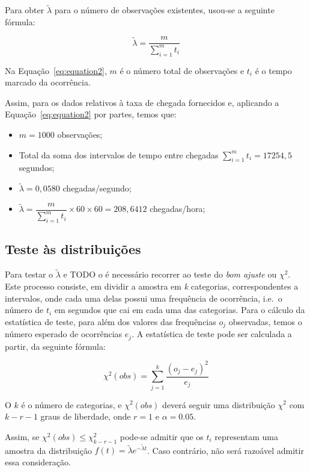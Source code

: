 Para obter $\tilde{\lambda}$ para o número de observações existentes, usou-se
a seguinte fórmula:

\begin{equation}
	\tilde{\lambda}	= \dfrac{m}{\sum^{m}_{i=1} t_i}
	\label{eq:equation2}
\end{equation}

Na Equação~\ref{eq:equation2}, $m$ é o número total de observações e $t_i$
é o tempo marcado da ocorrência.

Assim, para os dados relativos à taxa de chegada fornecidos
e, aplicando a Equação~\ref{eq:equation2} por partes, temos que:

\begin{itemize}
	\item $m=1000$ observações; 
	\item Total da soma dos intervalos de tempo entre chegadas $\sum^{m}_{i=1}
		t_i = 17254,5$ segundos;
	\item $\tilde{\lambda} = 0,0580$ chegadas/segundo;
	\item $\tilde{\lambda} = \dfrac{m}{\sum^{m}_{i=1} t_i} \times 60 \times 60
		= 208,6412$ chegadas/hora;
\end{itemize}

\subsection{Teste às distribuições}
\label{subsection:td}
Para testar o $\tilde{\lambda}$ e TODO o é necessário recorrer ao teste do \emph{bom
ajuste} ou $\chi^2$. Este processo consiste, em dividir a amostra em \emph{k}
categorias, correspondentes a intervalos, onde cada uma delas possui uma
frequência de ocorrência, i.e.\, o número de $t_i$ em segundos que cai em cada
uma das categorias. Para o cálculo da estatística de teste, para além dos
valores das frequências $o_j$ observadas, temos o número esperado de ocorrências
$e_j$. A estatística de teste pode ser calculada a partir, da seguinte fórmula:

\begin{equation}
	\chi^{2}(obs) = \sum^{k}_{j=1}\dfrac{(o_j-e_j)^2}{e_j}	
	\label{eq:equation3}
\end{equation}


O $k$ é o número de categorias, e $\chi^{2}(obs)$ deverá seguir uma distribuição
$\chi^2$ com $k-r-1$ graus de liberdade, onde $r=1$ e $\alpha=0.05$.

Assim, se $\chi^{2}(obs) \leq \chi^{2}_{k-r-1}$ pode-se admitir que os $t_i$
representam uma amostra da distribuição
$f(t)=\tilde{\lambda}e^{-\tilde{\lambda}t}$. Caso contrário, não será razoável
admitir essa consideração.


